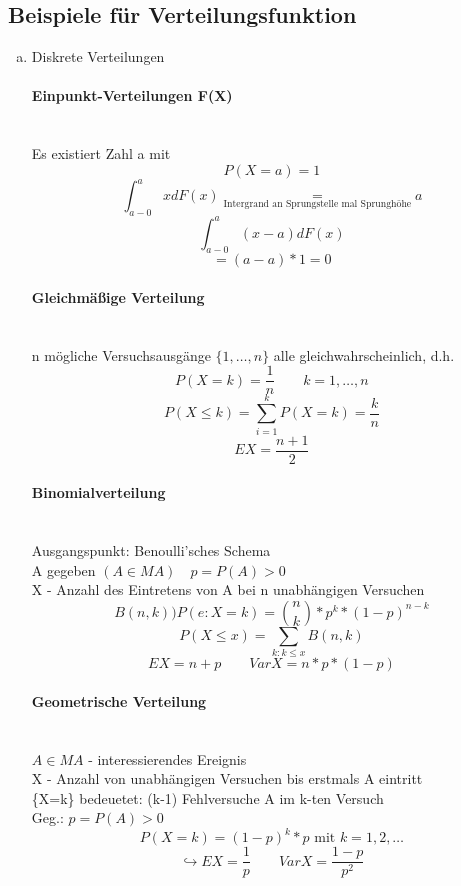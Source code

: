 \documentclass[a4paper,12pt]{scrartcl}
\begin{document}
\subsection{Beispiele für Verteilungsfunktion}
\begin{enumerate}[(a)]
 \item Diskrete Verteilungen \\
  \paragraph{Einpunkt-Verteilungen F(X)}\quad\\
  Es existiert Zahl a mit
  $$P(X=a) = 1 $$
  $$\int^a_{a-0}x dF(x) \underset{\text{Intergrand an Sprungstelle mal Sprunghöhe}}{=} a$$
  $$\int^a_{a-0} (x-a) dF(x) $$
  $$=(a-a)*1 = 0$$
  
 \paragraph{Gleichmäßige Verteilung}\quad\\
  n mögliche Versuchsausgänge $\{1,\dots,n\}$ alle gleichwahrscheinlich, d.h.
  $$P(X=k) = \frac{1}{n}\quad\quad k=1,\dots,n $$
  $$P(X\leq k) = \sum_{i=1}^k P(X=k)=\frac{k}{n} $$
  $$EX = \frac{n+1}{2}$$
  
  \paragraph{Binomialverteilung}\quad\\
  Ausgangspunkt: Benoulli'sches Schema\\
  A gegeben $(A\in MA)\quad p=P(A) > 0$\\
  X - Anzahl des Eintretens von A bei n unabhängigen Versuchen
  $$B(n,k) ) P(e:X=k) = \binom{n}{k} * p^k * (1-p)^{n-k} $$
  $$P(X\leq x) = \sum_{k:k\leq x} B(n,k) $$
  $$EX = n+p \quad\quad VarX = n*p*(1-p) $$
  
  \paragraph{Geometrische Verteilung}\quad\\
  $A \in MA$ - interessierendes Ereignis\\
  X - Anzahl von unabhängigen Versuchen bis erstmals A eintritt\\
  \{X=k\} bedeuetet: (k-1) Fehlversuche A im k-ten Versuch\\
  Geg.: $p=P(A)>0$\\
  $$P(X=k) = (1-p)^k * p\text{      mit }k=1,2,\dots$$
  $$\hookrightarrow EX = \frac{1}{p}\quad\quad VarX = \frac{1-p}{p^2}$$
  

\end{enumerate}
\end{document}
